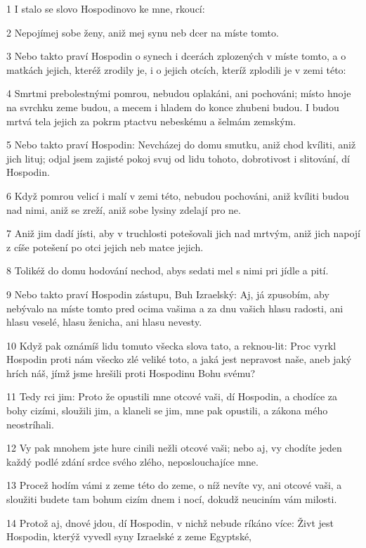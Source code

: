 \par 1 I stalo se slovo Hospodinovo ke mne, rkoucí:
\par 2 Nepojímej sobe ženy, aniž mej synu neb dcer na míste tomto.
\par 3 Nebo takto praví Hospodin o synech i dcerách zplozených v míste tomto, a o matkách jejich, kteréž zrodily je, i o jejich otcích, kteríž zplodili je v zemi této:
\par 4 Smrtmi prebolestnými pomrou, nebudou oplakáni, ani pochováni; místo hnoje na svrchku zeme budou, a mecem i hladem do konce zhubeni budou. I budou mrtvá tela jejich za pokrm ptactvu nebeskému a šelmám zemským.
\par 5 Nebo takto praví Hospodin: Nevcházej do domu smutku, aniž chod kvíliti, aniž jich lituj; odjal jsem zajisté pokoj svuj od lidu tohoto, dobrotivost i slitování, dí Hospodin.
\par 6 Když pomrou velicí i malí v zemi této, nebudou pochováni, aniž kvíliti budou nad nimi, aniž se zreží, aniž sobe lysiny zdelají pro ne.
\par 7 Aniž jim dadí jísti, aby v truchlosti potešovali jich nad mrtvým, aniž jich napojí z cíše potešení po otci jejich neb matce jejich.
\par 8 Tolikéž do domu hodování nechod, abys sedati mel s nimi pri jídle a pití.
\par 9 Nebo takto praví Hospodin zástupu, Buh Izraelský: Aj, já zpusobím, aby nebývalo na míste tomto pred ocima vašima a za dnu vašich hlasu radosti, ani hlasu veselé, hlasu ženicha, ani hlasu nevesty.
\par 10 Když pak oznámíš lidu tomuto všecka slova tato, a reknou-lit: Proc vyrkl Hospodin proti nám všecko zlé veliké toto, a jaká jest nepravost naše, aneb jaký hrích náš, jímž jsme hrešili proti Hospodinu Bohu svému?
\par 11 Tedy rci jim: Proto že opustili mne otcové vaši, dí Hospodin, a chodíce za bohy cizími, sloužili jim, a klaneli se jim, mne pak opustili, a zákona mého neostríhali.
\par 12 Vy pak mnohem jste hure cinili nežli otcové vaši; nebo aj, vy chodíte jeden každý podlé zdání srdce svého zlého, neposlouchajíce mne.
\par 13 Procež hodím vámi z zeme této do zeme, o níž nevíte vy, ani otcové vaši, a sloužiti budete tam bohum cizím dnem i nocí, dokudž neuciním vám milosti.
\par 14 Protož aj, dnové jdou, dí Hospodin, v nichž nebude ríkáno více: Živt jest Hospodin, kterýž vyvedl syny Izraelské z zeme Egyptské,
